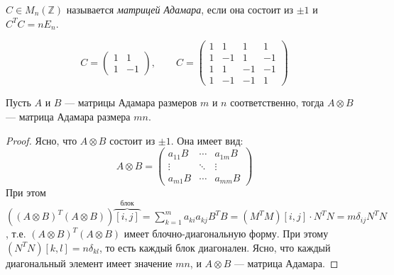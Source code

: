\begin{defn}
    $C \in M_n(\mathbb{Z})$ называется \textit{матрицей Адамара}, если она состоит из $\pm 1$ и $C^T C = nE_n$.
\end{defn}

\begin{exmpl}
    \[
    C = \begin{pmatrix}
        1 &  1 \\
        1 & -1
    \end{pmatrix}, \qquad
    C = \begin{pmatrix}
        1 &  1 &  1 &  1 \\
        1 & -1 &  1 & -1 \\
        1 &  1 & -1 & -1 \\
        1 & -1 & -1 &  1
    \end{pmatrix}
    \]
\end{exmpl}

\begin{thm}
    Пусть $A$ и $B$ --- матрицы Адамара размеров $m$ и $n$ соответственно, тогда $A \otimes B$ --- матрица Адамара размера $mn$.
\end{thm}

\begin{proof}
    Ясно, что $A \otimes B$ состоит из $\pm 1$. Она имеет вид:
    $$A \otimes B = \begin{pmatrix}
        a_{11} B & \cdots & a_{1m} B \\
        \vdots   & \ddots & \vdots   \\
        a_{m1} B & \cdots & a_{mm} B
    \end{pmatrix}$$
    При этом $((A \otimes B)^T (A \otimes B))\overbrace{[i, j]}^{\text{блок}} = \sum_{k=1}^m a_{ki} a_{kj} B^TB = (M^TM)[i, j] \cdot N^TN = m \delta_{ij} N^TN$, т.е. $(A \otimes B)^T(A \otimes B)$ имеет блочно-диагональную форму. При этому $(N^TN)[k, l] = n\delta_{kl}$, то есть каждый блок диагонален. Ясно, что каждый диагональный элемент имеет значение $mn$, и $A \otimes B$ --- матрица Адамара.
\end{proof}